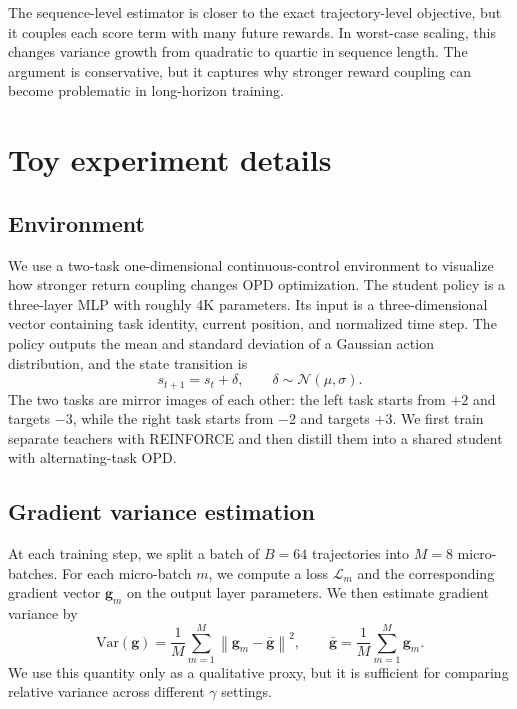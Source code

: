 \documentclass{article}
\begin{document}
The sequence-level estimator is closer to the exact trajectory-level objective, but it couples each score term with many future rewards. In worst-case scaling, this changes variance growth from quadratic to quartic in sequence length. The argument is conservative, but it captures why stronger reward coupling can become problematic in long-horizon training.

\section{Toy experiment details}
\label{app:toy}

\subsection{Environment}

We use a two-task one-dimensional continuous-control environment to visualize how stronger return coupling changes OPD optimization. The student policy is a three-layer MLP with roughly 4K parameters. Its input is a three-dimensional vector containing task identity, current position, and normalized time step. The policy outputs the mean and standard deviation of a Gaussian action distribution, and the state transition is
\[
s_{t+1} = s_t + \delta,
\qquad
\delta \sim \mathcal{N}(\mu, \sigma).
\]
The two tasks are mirror images of each other: the left task starts from $+2$ and targets $-3$, while the right task starts from $-2$ and targets $+3$. We first train separate teachers with REINFORCE and then distill them into a shared student with alternating-task OPD.

\subsection{Gradient variance estimation}

At each training step, we split a batch of $B=64$ trajectories into $M=8$ micro-batches. For each micro-batch $m$, we compute a loss $\mathcal{L}_m$ and the corresponding gradient vector $\mathbf g_m$ on the output layer parameters. We then estimate gradient variance by
\[
\mathrm{Var}(\mathbf g)
=
\frac{1}{M}
\sum_{m=1}^{M}
\left\|
\mathbf g_m - \bar{\mathbf g}
\right\|^2,
\qquad
\bar{\mathbf g}
=
\frac{1}{M}
\sum_{m=1}^{M}
\mathbf g_m.
\]
We use this quantity only as a qualitative proxy, but it is sufficient for comparing relative variance across different $\gamma$ settings.
\end{document}

